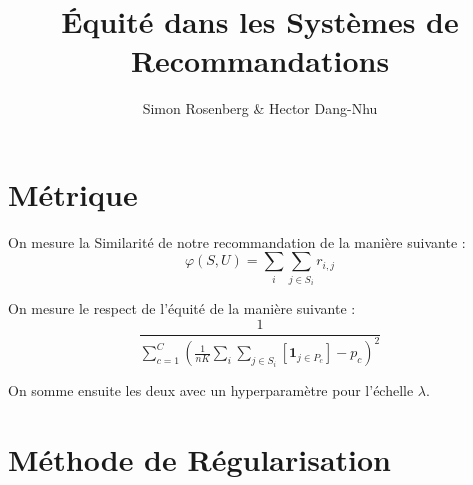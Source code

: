 \documentclass{article}
\title{Équité dans les Systèmes de Recommandations}
\author{Simon Rosenberg \& Hector Dang-Nhu}
\renewcommand{\phi}[0]{\varphi}
\begin{document}
\maketitle
\section{Métrique}
\par On mesure la Similarité de notre recommandation de la manière suivante :
$$
\phi(S,U) = \sum_i\sum_{j\in S_i}r_{i,j}
$$
\par On mesure le respect de l'équité de la manière suivante :
$$
\frac{1}{\sum_{c=1}^C\left(\frac{1}{nK}\sum_i\sum_{j\in S_i}\left[\bm{1}_{j\in P_c}\right] - p_c\right)^2}
$$
\par On somme ensuite les deux avec un hyperparamètre pour l'échelle $\lambda$.
\section{Méthode de Régularisation}
\end{document}
